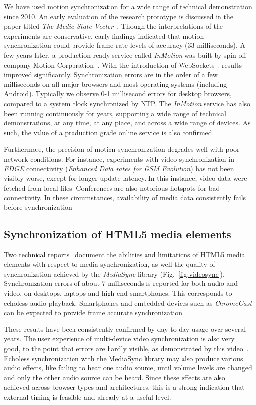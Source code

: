 \documentclass[graybox]{svmult}
\begin{document}
We have used motion synchronization for a wide range of technical
demonstration since 2010. An early evaluation of the research prototype is
discussed in the paper titled \emph{The Media State Vector}~\cite{msv}. Though
the interpretations of the experiments are conservative, early findings
indicated that motion synchronization could provide frame rate levels of
accuracy (33 milliseconds). A few years later, a production ready service
called \emph{InMotion} was built by spin off company Motion
Corporation~\cite{mcorp}. With the introduction of
WebSockets~\cite{websocket}, results improved significantly. Synchronization
errors are in the order of a few milliseconds on all major browsers and most
operating systems (including Android). Typically we observe 0-1 millisecond
errors for desktop browsers, compared to a system clock synchronized by NTP.
The \emph{InMotion} service has also been running continuously for years,
supporting a wide range of technical demonstrations, at any time, at any
place, and across a wide range of devices. As such, the value of a production
grade online service is also confirmed.

Furthermore, the precision of motion synchronization degrades well with poor
network conditions. For instance, experiments with video synchronization in 
\emph{EDGE} connectivity (\emph{Enhanced Data rates for GSM Evolution})
has not been visibly worse, except for longer update
latency. In this instance, video data were fetched from local files.
Conferences are also notorious hotspots for bad connectivity. In these
circumstances, availability of media data consistently fails before
synchronization.


\subsection {Synchronization of HTML5 media elements}

Two technical reports~\cite{syncreport1,syncreport2} document the abilities
and limitations of HTML5 media elements with respect to media synchronization,
as well the quality of synchronization achieved by the \emph{MediaSync}
library (Fig.~\ref{fig:videosync}). Synchronization errors of about 7 milliseconds 
is reported for both
audio and video, on desktops, laptops and high-end smartphones. This
corresponds to echoless audio playback. Smartphones and embedded devices such
as \emph{ChromeCast} can be expected to provide frame accurate synchronization. 

These results have been consistently confirmed by day to day usage over
several years. The user experience of multi-device video synchronization is
also very good, to the point that errors are hardly visible, as demonstrated by
this video~\cite{carneval}. Echoless synchronization with the MediaSync
library may also produce various audio effects, like failing to hear one audio
source, until volume levels are changed and only the other audio source can be
heard. Since these effects are also achieved across browser types and
architectures, this is a strong indication that external timing is feasible
and already at a useful level.
\end{document}
